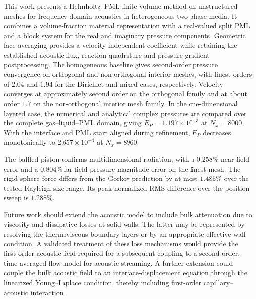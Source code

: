 \documentclass[final,12pt,nopreprintline,longtitle]{elsarticle}
\begin{document}
This work presents a Helmholtz--PML finite-volume method on unstructured meshes
for frequency-domain acoustics in heterogeneous two-phase media.  It combines
a volume-fraction material representation with a real-valued split PML and a
block system for the real and imaginary pressure components.  Geometric face
averaging provides a velocity-independent coefficient while retaining the
established acoustic flux, reaction quadrature and pressure-gradient
postprocessing.  The
homogeneous baseline gives second-order pressure convergence on orthogonal and
non-orthogonal interior meshes, with finest orders of $2.04$ and $1.94$ for the
Dirichlet and mixed cases, respectively.  Velocity converges at approximately
second order on the orthogonal family and at about order $1.7$ on the
non-orthogonal interior mesh family.  In the one-dimensional layered case, the numerical
and analytical complex pressures are compared over the complete gas--liquid--PML
domain, giving $E_P=1.197\times10^{-3}$ at $N_x=8000$.  With the interface and
PML start aligned during refinement, $E_P$ decreases monotonically to
$2.657\times10^{-4}$ at $N_x=8960$.

The baffled piston confirms multidimensional radiation, with a $0.258\%$
near-field error and a $0.804\%$ far-field pressure-magnitude error on the
finest mesh.  The rigid-sphere
force differs from the Gorkov prediction by at most
$1.485\%$ over the tested Rayleigh size range.  Its peak-normalized RMS
difference over the position sweep is $1.288\%$.

Future work should extend the acoustic model to include bulk attenuation due
to viscosity and dissipative losses at solid walls.  The latter
may be represented by resolving the thermoviscous boundary layers or by an
appropriate effective wall condition.  A validated treatment of these loss
mechanisms would provide the first-order acoustic field required for a
subsequent coupling to a second-order, time-averaged flow model for acoustic
streaming.  A further extension could couple the bulk acoustic field to an
interface-displacement equation through the linearized Young--Laplace
condition, thereby including first-order capillary--acoustic interaction.
\end{document}
